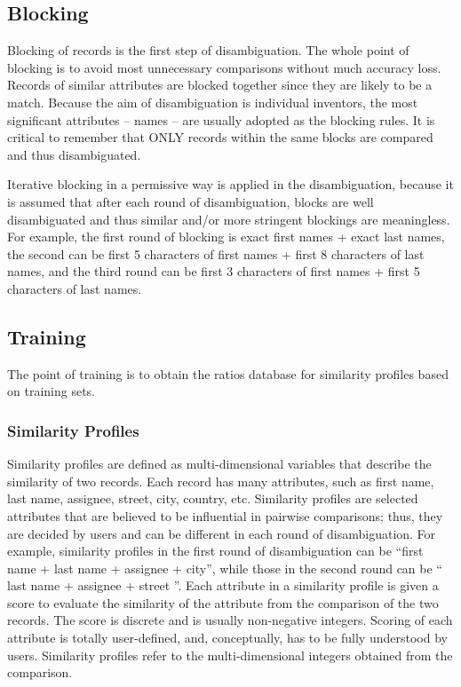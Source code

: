 \documentclass{article}
\begin{document}
\subsection{Blocking}

Blocking of records is the first step of disambiguation. 
The whole point of blocking is to avoid most
unnecessary comparisons without much accuracy loss. Records 
of similar attributes are blocked
together since they are likely to be a match. Because the 
aim of disambiguation is individual inventors,
the most significant attributes – names – are 
usually adopted as the blocking rules. It is critical to
remember that ONLY records within the same blocks are 
compared and thus disambiguated.


Iterative blocking in a permissive way is applied in the 
disambiguation, because it is assumed that after each round 
of disambiguation, blocks are well disambiguated and thus 
similar and/or more stringent blockings are meaningless. 
For example, the first round of blocking is exact 
first names + exact last names, the second can 
be first 5 characters of first names + first 8 characters 
of last names, and the third round can be first 
3 characters of first names + first 5 characters of last names.


\subsection{Training}

The point of training is to obtain the ratios database for 
similarity profiles based on training sets.

\subsubsection{Similarity Profiles}

Similarity profiles are defined as multi-dimensional variables 
that describe the similarity of two records. Each record has 
many attributes, such as first name, last name, assignee, street, 
city, country, etc. Similarity profiles are selected attributes 
that are believed to be influential in pairwise comparisons; thus, 
they are decided by users and can be different in each round of 
disambiguation. For example, similarity profiles in the first round 
of disambiguation can be “first name + last name + assignee + 
city”, while those in the second round can be “ last name + 
assignee + street ”. Each attribute in a similarity profile is 
given a score to evaluate the similarity of the attribute from the
comparison of the two records. The score is discrete and is usually 
non-negative integers. Scoring of each attribute is totally 
user-defined, and, conceptually, has to be fully understood by users.
Similarity profiles refer to the multi-dimensional integers obtained 
from the comparison.
\end{document}

